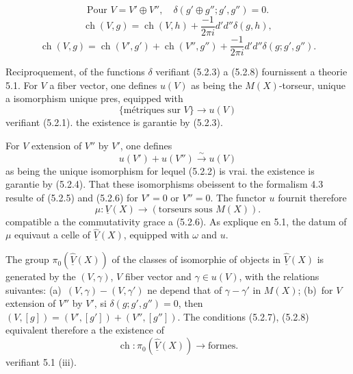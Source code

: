 \documentclass[12pt,a4paper]{article}
\theoremstyle{plain}
\theoremstyle{definition}
\DeclareMathOperator{\ch}{ch}
\begin{document}
\begin{equation}\label{eq:5.2.6}
\text{Pour } V = V' \oplus V'', \quad \delta(g' \oplus g''; g', g'') = 0.
\end{equation}
\begin{equation}\label{eq:5.2.7}
\ch(V, g) = \ch(V, h) + \frac{-1}{2\pi i} d'd'' \delta(g, h),
\end{equation}
\begin{equation}\label{eq:5.2.8}
\ch(V, g) = \ch(V', g') + \ch(V'', g'') + \frac{-1}{2\pi i} d'd'' \delta(g; g', g'').
\end{equation}

Reciproquement, of the functions $\delta$ verifiant (5.2.3) a (5.2.8) fournissent
a theorie 5.1. For $V$ a fiber vector, one defines $u(V)$ as being the
$M(X)$-torseur, unique a isomorphism unique pres, equipped with
\[
\{\text{m\'etriques sur } V\} \longrightarrow u(V)
\]
verifiant (5.2.1). the existence is garantie by (5.2.3).

For $V$ extension of $V''$ by $V'$, one defines
\[
u(V') + u(V'') \xrightarrow{\sim} u(V)
\]
as being the unique isomorphism for lequel (5.2.2) is vrai. the existence is
garantie by (5.2.4). That these isomorphisms obeissent to the formalism 4.3 resulte
of (5.2.5) and (5.2.6) for $V' = 0$ or $V'' = 0$. The functor $u$ fournit therefore
\[
\mu: \underline{V}(X) \longrightarrow (\text{torseurs sous } M(X)) .
\]
compatible a the commutativity grace a (5.2.6). As explique en 5.1, the datum
of $\mu$ equivaut a celle of $\widehat{\underline{V}}(X)$, equipped with $\omega$ and $u$.

The group $\pi_0(\widehat{\underline{V}}(X))$ of the classes of isomorphie of objects in $\widehat{\underline{V}}(X)$ is generated
by the $(V, \gamma)$, $V$ fiber vector and $\gamma \in u(V)$, with the relations suivantes:
(a)~$(V, \gamma) - (V, \gamma')$ ne depend that of $\gamma - \gamma'$ in $M(X)$; (b)~for $V$ extension
of $V''$ by $V'$, si $\delta(g; g', g'') = 0$, then $(V, [g]) = (V', [g']) + (V'', [g''])$.
The conditions (5.2.7), (5.2.8) equivalent therefore a the existence of
\[
\ch: \pi_0(\widehat{\underline{V}}(X)) \longrightarrow \text{formes} .
\]
verifiant 5.1 (iii).

\subsection{}
\end{document}
